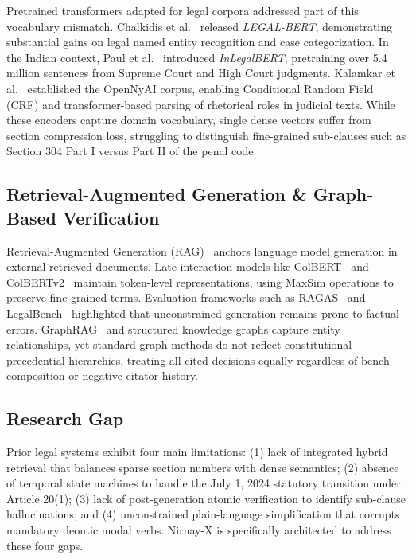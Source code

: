 \documentclass[conference]{IEEEtran}
\begin{document}
Pretrained transformers adapted for legal corpora addressed part of this vocabulary mismatch. Chalkidis et al.~\cite{chalkidis2020legal} released \textit{LEGAL-BERT}, demonstrating substantial gains on legal named entity recognition and case categorization. In the Indian context, Paul et al.~\cite{paul2022pre} introduced \textit{InLegalBERT}, pretraining over 5.4 million sentences from Supreme Court and High Court judgments. Kalamkar et al.~\cite{kalamkar2022corpus} established the OpenNyAI corpus, enabling Conditional Random Field (CRF) and transformer-based parsing of rhetorical roles in judicial texts. While these encoders capture domain vocabulary, single dense vectors suffer from section compression loss, struggling to distinguish fine-grained sub-clauses such as Section 304 Part I versus Part II of the penal code.

\subsection{Retrieval-Augmented Generation \& Graph-Based Verification}
Retrieval-Augmented Generation (RAG)~\cite{lewis2020retrieval} anchors language model generation in external retrieved documents. Late-interaction models like ColBERT~\cite{khattab2020colbert} and ColBERTv2~\cite{santhanam2022colbertv2} maintain token-level representations, using MaxSim operations to preserve fine-grained terms. Evaluation frameworks such as RAGAS~\cite{es2024ragas} and LegalBench~\cite{guha2023legalbench} highlighted that unconstrained generation remains prone to factual errors. GraphRAG~\cite{edge2024graphrag} and structured knowledge graphs capture entity relationships, yet standard graph methods do not reflect constitutional precedential hierarchies, treating all cited decisions equally regardless of bench composition or negative citator history.

\subsection{Research Gap}
Prior legal systems exhibit four main limitations:
(1) lack of integrated hybrid retrieval that balances sparse section numbers with dense semantics;
(2) absence of temporal state machines to handle the July 1, 2024 statutory transition under Article 20(1);
(3) lack of post-generation atomic verification to identify sub-clause hallucinations; and
(4) unconstrained plain-language simplification that corrupts mandatory deontic modal verbs. Nirnay-X is specifically architected to address these four gaps.
\end{document}
